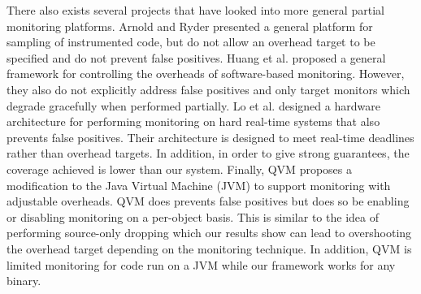 There also exists several projects that have looked into more general partial
monitoring platforms. Arnold and Ryder \cite{arnold-pldi01} presented a general
platform for sampling of instrumented code, but do not allow an overhead target
to be specified and do not prevent false positives. Huang et al.
\cite{huang-sttt12} proposed a general framework for controlling the overheads
of software-based monitoring. However, they also do not explicitly address
false positives and only target monitors which degrade gracefully when
performed partially. Lo et al. \cite{lo-rtas14} designed a hardware
architecture for performing monitoring on hard real-time systems that also
prevents false positives. Their architecture is designed to meet real-time
deadlines rather than overhead targets. In addition, in order to give strong
guarantees, the coverage achieved is lower than our system. Finally, QVM
\cite{qvm-oopsla08} proposes a modification to the Java Virtual Machine (JVM) to
support monitoring with adjustable overheads. QVM does prevents false positives
but does so be enabling or disabling monitoring on a per-object basis. This is
similar to the idea of performing source-only dropping which our results show
can lead to overshooting the overhead target depending on the monitoring
technique. In addition, QVM is limited monitoring for code run on a JVM while
our framework works for any binary.



